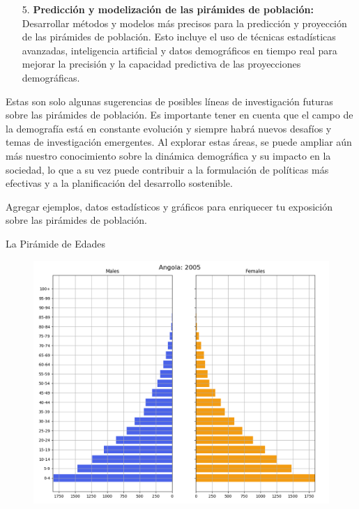\documentclass[8pt,a4paper]{beamer}
\begin{document}
{\begin{frame}{}
\begin{block}{}
\begin{enumerate}
\item[5.] \textbf{Predicción y modelización de las pirámides de población:} Desarrollar métodos y modelos más precisos para la predicción y proyección de las pirámides de población. Esto incluye el uso de técnicas estadísticas avanzadas, inteligencia artificial y datos demográficos en tiempo real para mejorar la precisión y la capacidad predictiva de las proyecciones demográficas.
\end{enumerate}
Estas son solo algunas sugerencias de posibles líneas de investigación futuras sobre las pirámides de población. Es importante tener en cuenta que el campo de la demografía está en constante evolución y siempre habrá nuevos desafíos y temas de investigación emergentes. Al explorar estas áreas, se puede ampliar aún más nuestro conocimiento sobre la dinámica demográfica y su impacto en la sociedad, lo que a su vez puede contribuir a la formulación de políticas más efectivas y a la planificación del desarrollo sostenible.

Agregar ejemplos, datos estadísticos y gráficos para enriquecer tu exposición sobre las pirámides de población.
\end{block}
\end{frame}


\begin{frame}{La Pirámide de Edades}

\begin{figure}[hbtp]
\centering
\includegraphics[scale=0.30]{1.png}
\label{fig:2}
\end{figure}


\end{frame}}
\end{document}
